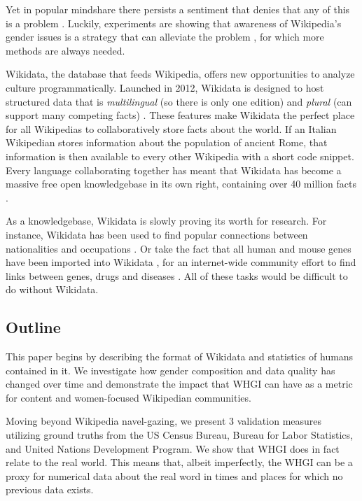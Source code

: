\documentclass{sig-alternate-05-2015}
\begin{document}
Yet in popular mindshare there persists a sentiment that denies that any of this is a problem \cite{eckert_retriggering_2013}. Luckily, experiments are showing that awareness of Wikipedia's gender issues is a strategy that can alleviate the problem \cite{hinnosaar_gender_2015}, for which more methods are always needed.

Wikidata, the database that feeds Wikipedia, offers new opportunities to analyze culture programmatically. Launched in 2012, Wikidata is designed to host structured data that is \textit{multilingual} (so there is only one edition) and \textit{plural} (can support many competing facts) \cite{vrandecic_wikidata:_2014}.  These features make Wikidata the perfect place for all Wikipedias to collaboratively store facts about the world. If an Italian Wikipedian stores information about the population of ancient Rome, that information is then available to every other Wikipedia with a short code snippet. Every language collaborating together has meant that Wikidata has become a massive free open knowledgebase in its own right, containing over 40 million facts \cite{krotzsch_how_????}.

As a knowledgebase, Wikidata is slowly proving its worth for research. For instance, Wikidata has been used to find popular connections between nationalities and occupations \cite{goldfarb_quantifying_2015}. Or take the fact that all human and mouse genes have been imported into Wikidata \cite{mitraka_wikidata:_2015}, for an internet-wide community effort to find links between genes, drugs and diseases \cite{burgstaller-muehlbacher_wikidata_2015}. All of these tasks would be difficult to do without Wikidata.

\subsection{Outline}

This paper begins by describing the format of Wikidata and statistics of humans contained in it. We investigate how gender composition and data quality has changed over time and demonstrate the impact that WHGI can have as a metric for content and women-focused Wikipedian communities.  

Moving beyond Wikipedia navel-gazing, we present 3 validation measures utilizing ground truths from the US Census Bureau, Bureau for Labor Statistics, and United Nations Development Program. We show that WHGI does in fact relate to the real world. This means that, albeit imperfectly, the WHGI can be a proxy for numerical data about the real word in times and places for which no previous data exists.
\end{document}
